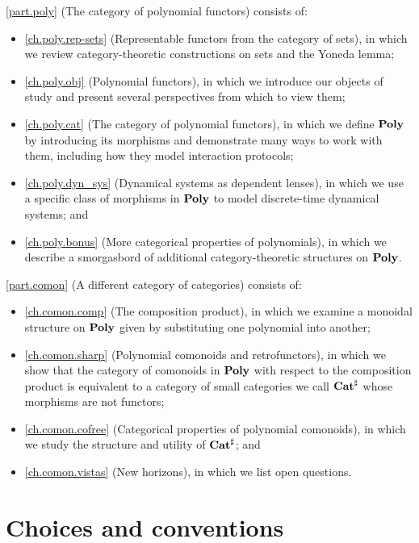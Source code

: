 \documentclass[Book-Poly]{subfiles}
\begin{document}
\bigskip

\cref{part.poly} (The category of polynomial functors) consists of:
\begin{itemize}
  \item \cref{ch.poly.rep-sets} (Representable functors from the category of sets), in which we review category-theoretic constructions on sets and the Yoneda lemma;
  \item \cref{ch.poly.obj} (Polynomial functors), in which we introduce our objects of study and present several perspectives from which to view them;
  \item \cref{ch.poly.cat} (The category of polynomial functors), in which we define $\mathbf{Poly}$ by introducing its morphisms and demonstrate many ways to work with them, including how they model interaction protocols;
  \item \cref{ch.poly.dyn_sys} (Dynamical systems as dependent lenses), in which we use a specific class of morphisms in $\mathbf{Poly}$ to model discrete-time dynamical systems; and
  \item \cref{ch.poly.bonus} (More categorical properties of polynomials), in which we describe a smorgasbord of additional category-theoretic structures on $\mathbf{Poly}$.
\end{itemize}
\bigskip

\cref{part.comon} (A different category of categories) consists of:
\begin{itemize}
  \item \cref{ch.comon.comp} (The composition product), in which we examine a monoidal structure on $\mathbf{Poly}$ given by substituting one polynomial into another;
  \item \cref{ch.comon.sharp} (Polynomial comonoids and retrofunctors), in which we show that the category of comonoids in $\mathbf{Poly}$ with respect to the composition product is equivalent to a category of small categories we call $\mathbf{Cat}^\sharp$ whose morphisms are not functors;
  \item \cref{ch.comon.cofree} (Categorical properties of polynomial comonoids), in which we study the structure and utility of $\mathbf{Cat}^\sharp$; and
  \item \cref{ch.comon.vistas} (New horizons), in which we list open questions.
\end{itemize}

\section{Choices and conventions}\label{sec.choices}
\end{document}
